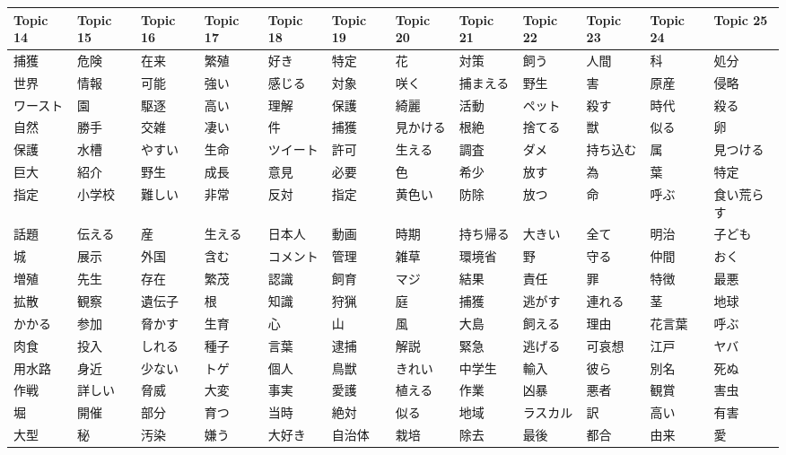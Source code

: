 \begin{table}[ht]
\centering
\begin{tabular}{llllllllllll}
  \hline
Topic 14 & Topic 15 & Topic 16 & Topic 17 & Topic 18 & Topic 19 & Topic 20 & Topic 21 & Topic 22 & Topic 23 & Topic 24 & Topic 25 \\ 
  \hline
捕獲 & 危険 & 在来 & 繁殖 & 好き & 特定 & 花 & 対策 & 飼う & 人間 & 科 & 処分 \\ 
  世界 & 情報 & 可能 & 強い & 感じる & 対象 & 咲く & 捕まえる & 野生 & 害 & 原産 & 侵略 \\ 
  ワースト & 園 & 駆逐 & 高い & 理解 & 保護 & 綺麗 & 活動 & ペット & 殺す & 時代 & 殺る \\ 
  自然 & 勝手 & 交雑 & 凄い & 件 & 捕獲 & 見かける & 根絶 & 捨てる & 獣 & 似る & 卵 \\ 
  保護 & 水槽 & やすい & 生命 & ツイート & 許可 & 生える & 調査 & ダメ & 持ち込む & 属 & 見つける \\ 
  巨大 & 紹介 & 野生 & 成長 & 意見 & 必要 & 色 & 希少 & 放す & 為 & 葉 & 特定 \\ 
  指定 & 小学校 & 難しい & 非常 & 反対 & 指定 & 黄色い & 防除 & 放つ & 命 & 呼ぶ & 食い荒らす \\ 
  話題 & 伝える & 産 & 生える & 日本人 & 動画 & 時期 & 持ち帰る & 大きい & 全て & 明治 & 子ども \\ 
  城 & 展示 & 外国 & 含む & コメント & 管理 & 雑草 & 環境省 & 野 & 守る & 仲間 & おく \\ 
  増殖 & 先生 & 存在 & 繁茂 & 認識 & 飼育 & マジ & 結果 & 責任 & 罪 & 特徴 & 最悪 \\ 
  拡散 & 観察 & 遺伝子 & 根 & 知識 & 狩猟 & 庭 & 捕獲 & 逃がす & 連れる & 茎 & 地球 \\ 
  かかる & 参加 & 脅かす & 生育 & 心 & 山 & 風 & 大島 & 飼える & 理由 & 花言葉 & 呼ぶ \\ 
  肉食 & 投入 & しれる & 種子 & 言葉 & 逮捕 & 解説 & 緊急 & 逃げる & 可哀想 & 江戸 & ヤバ \\ 
  用水路 & 身近 & 少ない & トゲ & 個人 & 鳥獣 & きれい & 中学生 & 輸入 & 彼ら & 別名 & 死ぬ \\ 
  作戦 & 詳しい & 脅威 & 大変 & 事実 & 愛護 & 植える & 作業 & 凶暴 & 悪者 & 観賞 & 害虫 \\ 
  堀 & 開催 & 部分 & 育つ & 当時 & 絶対 & 似る & 地域 & ラスカル & 訳 & 高い & 有害 \\ 
  大型 & 秘 & 汚染 & 嫌う & 大好き & 自治体 & 栽培 & 除去 & 最後 & 都合 & 由来 & 愛 \\ 

\end{tabular}
\end{table}
